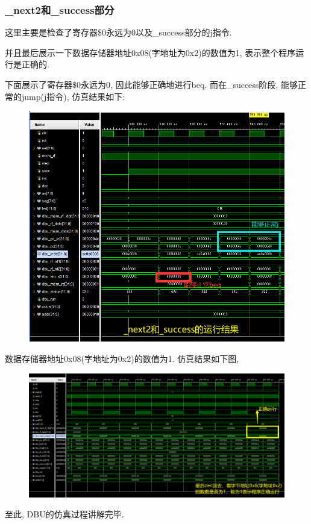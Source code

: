 \documentclass[UTF8]{article}
\begin{document}
\subsubsection{\_next2和\_success部分}
这里主要是检查了寄存器\$0永远为0以及\_success部分的j指令.\par
并且最后展示一下数据存储器地址0x08(字地址为0x2)的数值为1, 表示整个程序运行是正确的.\par
下面展示了寄存器\$0永远为0, 因此能够正确地进行beq. 而在\_success阶段, 能够正常的jump(j指令), 仿真结果如下:
\begin{figure}[H]
	\centering
	\includegraphics[width=\linewidth]{_next2_success.png}
\end{figure}
数据存储器地址0x08(字地址为0x2)的数值为1. 仿真结果如下图,
\begin{figure}[H]
	\centering
	\includegraphics[width=\linewidth]{final_check.png}
\end{figure}
至此, DBU的仿真过程讲解完毕.
\end{document}
